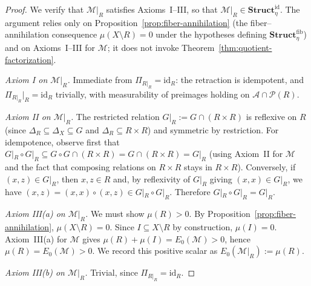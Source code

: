 \documentclass[11pt]{article}
\numberwithin{equation}{section}
\theoremstyle{definition}
\begin{document}
\begin{proof}
We verify that $\mathcal M|_R$ satisfies Axioms~I--III, so that $\mathcal M|_R\in\mathbf{Struct}^{\mathrm{id}}_{\eta}$. The argument relies only on Proposition~\ref{prop:fiber-annihilation} (the fiber--annihilation consequence $\mu(X\setminus R)=0$ under the hypotheses defining $\mathbf{Struct}_{\eta}^{\mathrm{fib}}$) and on Axioms~I--III for $\mathcal M$; it does not invoke Theorem~\ref{thm:quotient-factorization}.

\emph{Axiom I on $\mathcal M|_R$.} Immediate from $\Pi_{R|_R}=\mathrm{id}_R$: the retraction is idempotent, and $\Pi_{R|_R}|_R=\mathrm{id}_R$ trivially, with measurability of preimages holding on $\mathcal A\cap\mathcal P(R)$.

\emph{Axiom II on $\mathcal M|_R$.} The restricted relation $G|_R:=G\cap(R\times R)$ is reflexive on $R$ (since $\Delta_R\subseteq\Delta_X\subseteq G$ and $\Delta_R\subseteq R\times R$) and symmetric by restriction. For idempotence, observe first that $G|_R\circ G|_R\subseteq G\circ G\cap(R\times R)=G\cap(R\times R)=G|_R$ (using Axiom~II for $\mathcal M$ and the fact that composing relations on $R\times R$ stays in $R\times R$). Conversely, if $(x,z)\in G|_R$, then $x,z\in R$ and, by reflexivity of $G|_R$ giving $(x,x)\in G|_R$, we have $(x,z)=(x,x)\circ(x,z)\in G|_R\circ G|_R$. Therefore $G|_R\circ G|_R=G|_R$.

\emph{Axiom III(a) on $\mathcal M|_R$.} We must show $\mu(R)>0$. By Proposition~\ref{prop:fiber-annihilation}, $\mu(X\setminus R)=0$. Since $I\subseteq X\setminus R$ by construction, $\mu(I)=0$. Axiom~III(a) for $\mathcal M$ gives $\mu(R)+\mu(I)=E_0(\mathcal M)>0$, hence $\mu(R)=E_0(\mathcal M)>0$. We record this positive scalar as $E_0(\mathcal M|_R):=\mu(R)$.

\emph{Axiom III(b) on $\mathcal M|_R$.} Trivial, since $\Pi_{R|_R}=\mathrm{id}_R$.


\end{proof}
\end{document}
